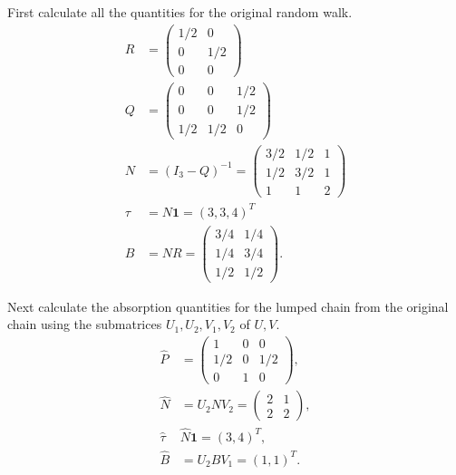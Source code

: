 \documentclass[12pt]{article}
\begin{document}
\begin{solution}
    First calculate all the quantities for the original random walk.
    \begin{align*}
        R &=
        \begin{pmatrix}
            1/2 & 0 \\
            0 & 1/2 \\
            0 & 0
        \end{pmatrix}
        \\
        Q &=
        \begin{pmatrix}
            0 & 0 & 1/2 \\
            0 & 0 & 1/2 \\
            1/2 & 1/2 & 0
        \end{pmatrix}
        \\
        N &= (I_3 - Q)^{-1} =
        \begin{pmatrix}
            3/2 & 1/2 & 1 \\
            1/2 & 3/2 & 1 \\
            1 & 1 & 2
        \end{pmatrix}
        \\
        \tau & = N \mathbf{1} = (3, 3, 4)^T \\
        B &= NR =
        \begin{pmatrix}
            3/4 & 1/4 \\
            1/4 & 3/4 \\
            1/2 & 1/2
        \end{pmatrix}
        .
    \end{align*}

    Next calculate the absorption quantities for the lumped chain from
    the original chain using the submatrices \( U_1, U_2, V_1, V_2 \) of
    \( U, V \).
    \begin{align*}
        \hat{P} &=
        \begin{pmatrix}
            1 & 0 & 0 \\
            1/2 & 0 & 1/2 \\
            0 & 1 & 0
        \end{pmatrix}
        , \\
        \hat{N} &= U_2 N V_2 =
        \begin{pmatrix}
            2 & 1 \\
            2 & 2
        \end{pmatrix}
        , \\
        \hat{\tau} & \hat{N} \mathbf{1} = (3,4)^T, \\
        \hat{B} &= U_2 B V_1 = (1,1)^T.
    \end{align*}


\end{solution}
\end{document}
